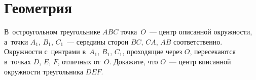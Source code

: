 \section*{Геометрия}



\begingroup \providecommand\ifincludesolutions{\iffalse}

\begingroup \def\piconst{\mathrm{\pi}}

\ifincludesolutions
\subsection*{Версия с решениями}
\fi

\begin{problems}

\item
В~остроугольном треугольнике $ABC$ точка~$O$~--- центр описанной окружности,
а~точки $A_1$, $B_1$, $C_1$~--- середины сторон $BC$, $CA$, $AB$
соответственно.
Окружности с~центрами в~$A_1$, $B_1$, $C_1$, проходящие через $O$, пересекаются
в~точках $D$, $E$, $F$, отличных от~$O$.
Докажите, что $O$~--- центр вписанной окружности треугольника $DEF$.

\end{problems}

\ifincludesolutions
Пусть $D$~--- отличная от~$O$ точка пересечения окружностей $\omega_B$
и~$\omega_C$ с~центрами $B_1$ и~$C_1$ из~условия;
$E$~--- $\omega_C$ и~$\omega_B$; аналогично $F$.
Достаточно показать, что $DO$~--- биссектриса угла $EDF$
(прямые $EO$ и~$FO$ также будут биссектрисами своих углов и~$O$ будет точкой
пересечения биссектрис).
Заметим, что $\angle EDO = \frac{1}{2} \angle E C_1 O = \angle O C_1 B_1$.
Первое равенство~--- соотношение вписанного и~центрального углов окружности
$\omega_C$, второе вытекает из~равенства треугольников
$E C_1 B_1$ и~$O C_1 B_1$.
Аналогично $\angle FDO = \frac{1}{2} \angle F A_1 O = \angle O A_1 B_1$.
Общеизвестно, что центр~$O$ описанной окружности треугольника $ABC$ является
также точкой пересечения высот треугольника $A_1B_1C_1$, а~значит $\angle
OC_1B_1 = 90^{\circ} - \angle C_1 B_1 A_1 = \angle O A_1 B_1$.
Из~выписанных равенств следует, что $\angle EDO = \angle FDO$ и~что прямая~$DO$
действительно является биссектрисой угла $EDF$.
\fi %

